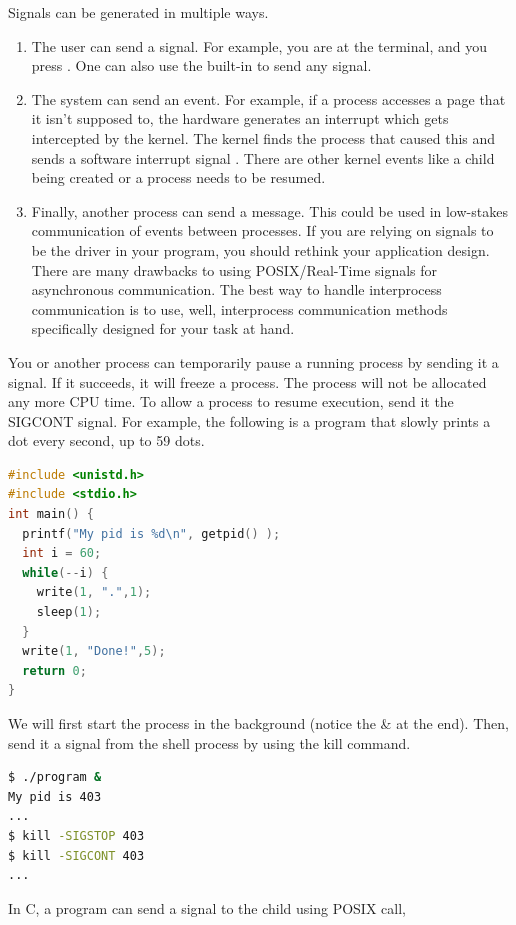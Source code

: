 Signals can be generated in multiple ways.
\begin{enumerate}
\item The user can send a signal.
  For example, you are at the terminal, and you press .
  One can also use the built-in  to send any signal.
\item The system can send an event.
For example, if a process accesses a page that it isn't supposed to, the hardware generates an interrupt which gets intercepted by the kernel.
The kernel finds the process that caused this and sends a \gls{software interrupt} signal .
There are other kernel events like a child being created or a process needs to be resumed.

\item Finally, another process can send a message.
  This could be used in low-stakes communication of events between processes.
  If you are relying on signals to be the driver in your program, you should rethink your application design.
  There are many drawbacks to using POSIX/Real-Time signals for asynchronous communication.
  The best way to handle interprocess communication is to use, well, interprocess communication methods specifically designed for your task at hand.
\end{enumerate}

You or another process can temporarily pause a running process by sending it a  signal.
If it succeeds, it will freeze a process.
The process will not be allocated any more CPU time.
To allow a process to resume execution, send it the SIGCONT signal.
For example, the following is a program that slowly prints a dot every second, up to 59 dots.

\begin{lstlisting}[language=C]
#include <unistd.h>
#include <stdio.h>
int main() {
  printf("My pid is %d\n", getpid() );
  int i = 60;
  while(--i) {
    write(1, ".",1);
    sleep(1);
  }
  write(1, "Done!",5);
  return 0;
}
\end{lstlisting}

We will first start the process in the background (notice the \& at the end).
Then, send it a signal from the shell process by using the kill command.

\begin{lstlisting}[language=bash]
$ ./program &
My pid is 403
...
$ kill -SIGSTOP 403
$ kill -SIGCONT 403
...
\end{lstlisting}

In C, a program can send a signal to the child using  POSIX call,

